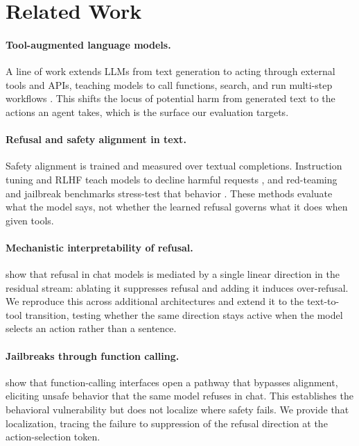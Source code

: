 \documentclass{article} %
\begin{document}
\section{Related Work}

  \paragraph{Tool-augmented language models.} A line of work extends LLMs from
  text generation to acting through external tools and APIs, teaching models to
  call functions, search, and run multi-step workflows
  \citep{schick2023toolformer, yao2023react, qin2023toolllm}. This shifts the
  locus of potential harm from generated text to the actions an agent takes,
  which is the surface our evaluation targets.

  \paragraph{Refusal and safety alignment in text.} Safety alignment is trained
  and measured over textual completions. Instruction tuning and RLHF teach models
  to decline harmful requests \citep{ouyang2022training, bai2022training,
  bai2022constitutional}, and red-teaming and jailbreak benchmarks stress-test
  that behavior \citep{ganguli2022red, perez2022red, mazeika2024harmbench}. These
  methods evaluate what the model says, not whether the learned refusal governs
  what it does when given tools.

  \paragraph{Mechanistic interpretability of refusal.} \citet{arditi2024refusal}
  show that refusal in chat models is mediated by a single linear direction in the
  residual stream: ablating it suppresses refusal and adding it induces
  over-refusal. We reproduce this across additional architectures and extend it to
  the text-to-tool transition, testing whether the same direction stays active
  when the model selects an action rather than a sentence.

  \paragraph{Jailbreaks through function calling.} \citet{wu2024darkside} show
  that function-calling interfaces open a pathway that bypasses alignment,
  eliciting unsafe behavior that the same model refuses in chat. This establishes
  the behavioral vulnerability but does not localize where safety fails. We
  provide that localization, tracing the failure to suppression of the refusal
  direction at the action-selection token.
\end{document}
